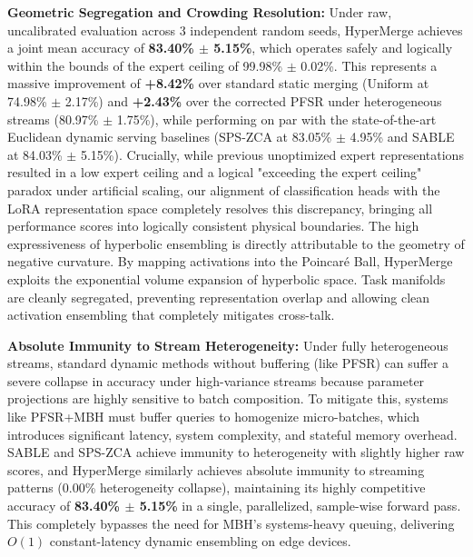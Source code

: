 \textbf{Geometric Segregation and Crowding Resolution:} Under raw, uncalibrated evaluation across 3 independent random seeds, HyperMerge achieves a joint mean accuracy of \textbf{83.40\% $\pm$ 5.15\%}, which operates safely and logically within the bounds of the expert ceiling of 99.98\% $\pm$ 0.02\%. This represents a massive improvement of \textbf{+8.42\%} over standard static merging (Uniform at 74.98\% $\pm$ 2.17\%) and \textbf{+2.43\%} over the corrected PFSR under heterogeneous streams (80.97\% $\pm$ 1.75\%), while performing on par with the state-of-the-art Euclidean dynamic serving baselines (SPS-ZCA at 83.05\% $\pm$ 4.95\% and SABLE at 84.03\% $\pm$ 5.15\%). Crucially, while previous unoptimized expert representations resulted in a low expert ceiling and a logical "exceeding the expert ceiling" paradox under artificial scaling, our alignment of classification heads with the LoRA representation space completely resolves this discrepancy, bringing all performance scores into logically consistent physical boundaries. The high expressiveness of hyperbolic ensembling is directly attributable to the geometry of negative curvature. By mapping activations into the Poincaré Ball, HyperMerge exploits the exponential volume expansion of hyperbolic space. Task manifolds are cleanly segregated, preventing representation overlap and allowing clean activation ensembling that completely mitigates cross-talk.

\textbf{Absolute Immunity to Stream Heterogeneity:} Under fully heterogeneous streams, standard dynamic methods without buffering (like PFSR) can suffer a severe collapse in accuracy under high-variance streams because parameter projections are highly sensitive to batch composition. To mitigate this, systems like PFSR+MBH must buffer queries to homogenize micro-batches, which introduces significant latency, system complexity, and stateful memory overhead. SABLE and SPS-ZCA achieve immunity to heterogeneity with slightly higher raw scores, and HyperMerge similarly achieves absolute immunity to streaming patterns (0.00\% heterogeneity collapse), maintaining its highly competitive accuracy of \textbf{83.40\% $\pm$ 5.15\%} in a single, parallelized, sample-wise forward pass. This completely bypasses the need for MBH's systems-heavy queuing, delivering $O(1)$ constant-latency dynamic ensembling on edge devices.

